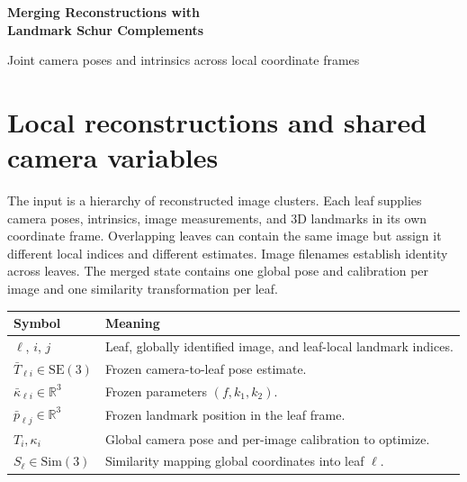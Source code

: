 \documentclass[11pt,letterpaper]{article}
\newcommand{\R}{\mathbb{R}}
\newcommand{\SE}{\mathrm{SE}(3)}
\newcommand{\Sim}{\mathrm{Sim}(3)}
\newcommand{\code}[1]{\texttt{\detokenize{#1}}}
\begin{document}
\thispagestyle{empty}
\begin{center}
{\LARGE\bfseries Merging Reconstructions with\\[4pt] Landmark Schur Complements\par}
\vspace{9pt}
{\large Joint camera poses and intrinsics across local coordinate frames}
\end{center}
\vspace{3pt}
\begin{abstract}
\noindent Independently reconstructed image clusters can be merged by summarizing
each cluster as a joint likelihood over its cameras. We linearize the local
reprojection problem and eliminate only landmark increments, retaining camera
poses, intrinsics, and their correlations. Each resulting Gaussian system is
factored into a Bayes tree and expressed in a common frame through a leaf-specific
similarity transformation. Shared images identify common pose and calibration
variables, and one root optimization reconciles all leaf evidence. This note
derives the Schur reduction, coordinate constraints, similarity-aware residuals,
analytic derivatives, and final camera information, and states the assumptions
under which the frozen approximation is useful.
\end{abstract}

\section{Local reconstructions and shared camera variables}
The input is a hierarchy of reconstructed image clusters. Each leaf supplies
camera poses, intrinsics, image measurements, and 3D landmarks in its own
coordinate frame. Overlapping leaves can contain the same image but assign it
different local indices and different estimates. Image filenames establish
identity across leaves. The merged state contains one global pose and calibration
per image and one similarity transformation per leaf.

\begin{center}
\begin{tabularx}{\linewidth}{@{}lX@{}}
\toprule
Symbol & Meaning \\
\midrule
$\ell$, $i$, $j$ & Leaf, globally identified image, and leaf-local landmark indices. \\
$\bar T_{\ell i}\in\SE$ & Frozen camera-to-leaf pose estimate. \\
$\bar\kappa_{\ell i}\in\R^3$ & Frozen \code{Cal3Bundler} parameters $(f,k_1,k_2)$. \\
$\bar p_{\ell j}\in\R^3$ & Frozen landmark position in the leaf frame. \\
$T_i,\kappa_i$ & Global camera pose and per-image calibration to optimize. \\
$S_\ell\in\Sim$ & Similarity mapping global coordinates into leaf $\ell$. \\
\bottomrule
\end{tabularx}
\end{center}
\end{document}
